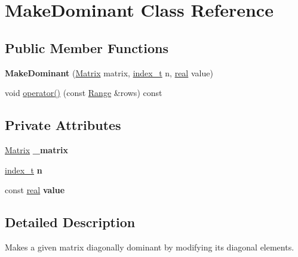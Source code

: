 \hypertarget{class_make_dominant}{
\section{MakeDominant Class Reference}
\label{class_make_dominant}
}
\subsection*{Public Member Functions}
\begin{CompactItemize}
\item 
\hypertarget{class_make_dominant_f6d79453b946ddd294f9c4d4109fbb5c}{
\textbf{MakeDominant} (\hyperlink{cowichan_8hpp_3fb46f939e55c239fbc95656fc0f3399}{Matrix} matrix, \hyperlink{cowichan_8hpp_5b04577d5d21124855deaad298595371}{index\_\-t} n, \hyperlink{cowichan_8hpp_4d521b2c54a1f6312cc8fa04827eaf98}{real} value)}
\label{class_make_dominant_f6d79453b946ddd294f9c4d4109fbb5c}

\item 
void \hyperlink{class_make_dominant_79c1af1cd1e60a39f5385409209c6cef}{operator()} (const \hyperlink{cowichan__tbb_8hpp_8e2057f725b08f3a15513c378a453a47}{Range} \&rows) const 
\end{CompactItemize}
\subsection*{Private Attributes}
\begin{CompactItemize}
\item 
\hypertarget{class_make_dominant_73325f3005d8887ca20b10fd2cdbdb0b}{
\hyperlink{cowichan_8hpp_3fb46f939e55c239fbc95656fc0f3399}{Matrix} \textbf{\_\-matrix}}
\label{class_make_dominant_73325f3005d8887ca20b10fd2cdbdb0b}

\item 
\hypertarget{class_make_dominant_770833546d40345b9408226ffbcc6417}{
\hyperlink{cowichan_8hpp_5b04577d5d21124855deaad298595371}{index\_\-t} \textbf{n}}
\label{class_make_dominant_770833546d40345b9408226ffbcc6417}

\item 
\hypertarget{class_make_dominant_b800551decfb81771f83ab869b459cd8}{
const \hyperlink{cowichan_8hpp_4d521b2c54a1f6312cc8fa04827eaf98}{real} \textbf{value}}
\label{class_make_dominant_b800551decfb81771f83ab869b459cd8}

\end{CompactItemize}


\subsection{Detailed Description}
Makes a given matrix diagonally dominant by modifying its diagonal elements. 

